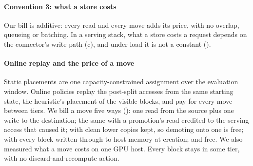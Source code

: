 \paragraph{Convention 3: what a store costs} Our bill is additive: every read and every move adds its price,
with no overlap, queueing or batching. In a serving stack, what a store costs a request depends on the
connector's write path (c), and under load it is not a constant ().

\paragraph{Online replay and the price of a move} Static placements are one capacity-constrained
assignment over the evaluation window. Online policies replay the post-split accesses from the same
starting state, the heuristic's placement of the visible blocks, and pay for every move between tiers.
We bill a move five ways (): one read from the source plus one write to the destination;
the same with a promotion's read credited to the serving access that caused it; with clean lower copies
kept, so demoting onto one is free; with every block written through to host memory at creation; and
free. We also measured what a move costs on one GPU host. Every block stays in some tier, with no
discard-and-recompute action.
